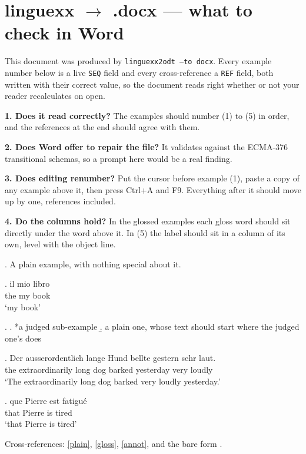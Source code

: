 \documentclass{article}
\begin{document}
\section*{linguexx $\to$ .docx — what to check in Word}

This document was produced by \texttt{linguexx2odt --to docx}. Every example
number below is a live \texttt{SEQ} field and every cross-reference a
\texttt{REF} field, both written with their correct value, so the document
reads right whether or not your reader recalculates on open.

\textbf{1. Does it read correctly?} The examples should number (1) to (5)
in order, and the references at the end should agree with them.

\textbf{2. Does Word offer to repair the file?} It validates against the
ECMA-376 transitional schemas, so a prompt here would be a real finding.

\textbf{3. Does editing renumber?} Put the cursor before example (1), paste
a copy of any example above it, then press Ctrl+A and F9. Everything after
it should move up by one, references included.

\textbf{4. Do the columns hold?} In the glossed examples each gloss word
should sit directly under the word above it. In (5) the label should sit in
a column of its own, level with the object line.

\ex.\label{plain} A plain example, with nothing special about it.

\exg.\label{gloss} il mio libro\\
     the my book\\
\glt `my book'

\ex.
\a. *a judged sub-example
\b. a plain one, whose text should start where the judged one's does

\exg. Der ausserordentlich lange Hund bellte gestern sehr laut.\\
      the extraordinarily long dog barked yesterday very loudly\\
\glt `The extraordinarily long dog barked very loudly yesterday.'

\exg.\label{annot} que Pierre est fatigu\'e \exannot{[CP]}\\
     that Pierre is tired\\
\glt `that Pierre is tired'

Cross-references: \ref{plain}, \ref{gloss}, \ref{annot}, and the bare
form .
\end{document}
